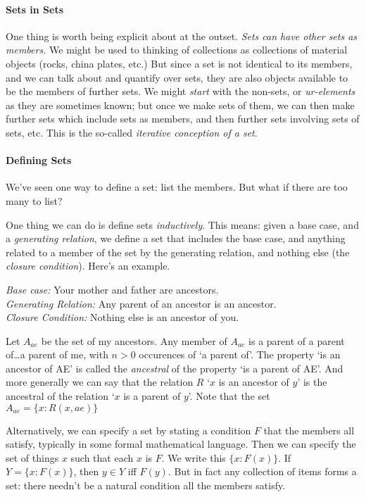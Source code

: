 \paragraph{Sets in Sets} One thing is worth being explicit about at the outset. \emph{Sets can have other sets as members.} We might be used to thinking of collections as collections of material objects (rocks, china plates, etc.) But since a set is not identical to its members, and we can talk about and quantify over sets, they are also objects available to be the members of further sets. We might \emph{start} with the non-sets, or \emph{ur-elements} as they are sometimes known; but once we make sets of them, we can then make further sets which include sets as members, and then further sets involving sets of sets, etc. This is the so-called \emph{iterative conception of a set}.


\paragraph{Defining Sets}

We've seen one way to define a set: list the members. But what if there are too many to list? 

One thing we can do is define sets \emph{inductively}. This means: given a base case, and a \emph{generating relation}, we define a set that includes the base case, and anything related to a member of the set by the generating relation, and   nothing else (the \emph{closure condition}). Here's an example. \begin{definition} 
   \emph{Base case:} Your mother and father are ancestors.\\ \emph{Generating Relation:} Any parent of an ancestor is an ancestor.\\ \emph{Closure Condition:} Nothing else is an ancestor of you.
 \end{definition}

Let $A_{ae}$ be the set of my ancestors. Any member of $A_{ae}$ is a parent of a parent of\ldots a parent of me, with $n >0$ occurences of `a parent of'. The property `is an ancestor of AE' is called the \emph{ancestral} of the property `is a parent of AE'. And more generally we can say that the relation $R$ `$x$ is an ancestor of $y$' is the ancestral of the relation `$x$ is a parent of $y$'. Note that the set $A_{ae} = \{x: R(x,ae)\}$

Alternatively, we can specify a set by stating a condition $F$ that the members all satisfy, typically in some formal mathematical language. Then we can specify the set of things $x$ such that each $x$ is $F$. We write this $\{x: F(x)\}$. If $Y = \{x:F(x)\}$, then $y \in Y$ iff $F(y)$. But in fact any collection of items forms a set: there needn't be a natural condition all the members satisfy.


